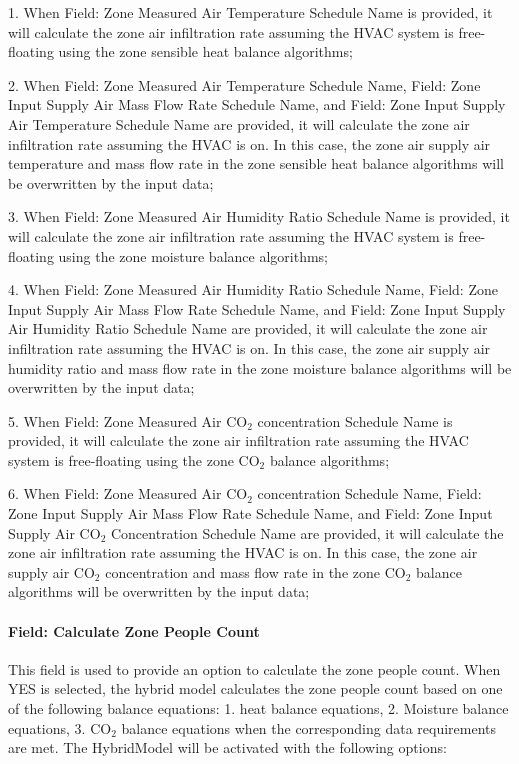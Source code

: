 1. When Field: Zone Measured Air Temperature Schedule Name is provided, it will calculate the zone air infiltration rate assuming the HVAC system is free-floating using the zone sensible heat balance algorithms;

2. When Field: Zone Measured Air Temperature Schedule Name, Field: Zone Input Supply Air Mass Flow Rate Schedule Name, and Field: Zone Input Supply Air Temperature Schedule Name are provided, it will calculate the zone air infiltration rate assuming the HVAC is on. In this case, the zone air supply air temperature and mass flow rate in the zone sensible heat balance algorithms will be overwritten by the input data;

3. When Field: Zone Measured Air Humidity Ratio Schedule Name is provided, it will calculate the zone air infiltration rate assuming the HVAC system is free-floating using the zone moisture balance algorithms;

4. When Field: Zone Measured Air Humidity Ratio Schedule Name, Field: Zone Input Supply Air Mass Flow Rate Schedule Name, and Field: Zone Input Supply Air Humidity Ratio Schedule Name are provided, it will calculate the zone air infiltration rate assuming the HVAC is on. In this case, the zone air supply air humidity ratio and mass flow rate in the zone moisture balance algorithms will be overwritten by the input data;

5. When Field: Zone Measured Air CO$_2$ concentration Schedule Name is provided, it will calculate the zone air infiltration rate assuming the HVAC system is free-floating using the zone CO$_2$ balance algorithms;

6. When Field: Zone Measured Air CO$_2$ concentration Schedule Name, Field: Zone Input Supply Air Mass Flow Rate Schedule Name, and Field: Zone Input Supply Air CO$_2$ Concentration Schedule Name are provided, it will calculate the zone air infiltration rate assuming the HVAC is on. In this case, the zone air supply air CO$_2$ concentration and mass flow rate in the zone CO$_2$ balance algorithms will be overwritten by the input data;

\paragraph{Field: Calculate Zone People Count}\label{field-calculate-zone-people-count-rate-hm}
This field is used to provide an option to calculate the zone people count.
When YES is selected, the hybrid model calculates the zone people count based on one of the following balance equations: 1. heat balance equations, 2. Moisture balance equations, 3. CO$_2$ balance equations when the corresponding data requirements are met. The HybridModel will be activated with the following options:


